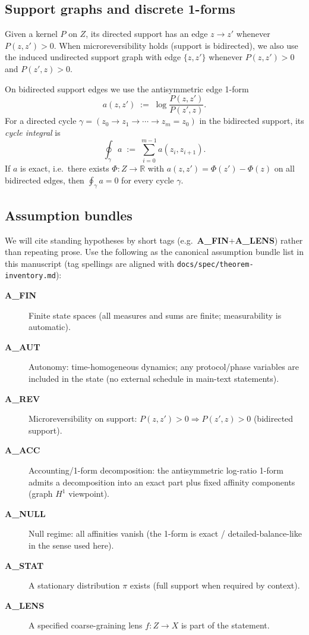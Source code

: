 \documentclass[11pt]{article}
\theoremstyle{remark}
\begin{document}
\subsection{Support graphs and discrete 1-forms}

Given a kernel $P$ on $Z$, its directed support has an edge $z\to z'$ whenever $P(z,z')>0$.
When microreversibility holds (support is bidirected), we also use the induced undirected support graph with edge $\{z,z'\}$ whenever $P(z,z')>0$ and $P(z',z)>0$.

On bidirected support edges we use the antisymmetric edge 1-form
\[
a(z,z') \;:=\; \log\frac{P(z,z')}{P(z',z)}.
\]
For a directed cycle $\gamma=(z_0\!\to z_1\!\to\cdots\to z_m=z_0)$ in the bidirected support, its \emph{cycle integral} is
\[
\oint_\gamma a \;:=\; \sum_{i=0}^{m-1} a(z_i,z_{i+1}).
\]
If $a$ is exact, i.e.\ there exists $\Phi:Z\to\mathbb{R}$ with $a(z,z')=\Phi(z')-\Phi(z)$ on all bidirected edges, then $\oint_\gamma a=0$ for every cycle $\gamma$.

\subsection{Assumption bundles}

We will cite standing hypotheses by short tags (e.g.\ \textbf{A\_FIN}+\textbf{A\_LENS}) rather than repeating prose.
Use the following as the canonical assumption bundle list in this manuscript (tag spellings are aligned with \texttt{docs/spec/theorem-inventory.md}):

\begin{description}
  \item[\textbf{A\_FIN}] Finite state spaces (all measures and sums are finite; measurability is automatic).
  \item[\textbf{A\_AUT}] Autonomy: time-homogeneous dynamics; any protocol/phase variables are included in the state (no external schedule in main-text statements).
  \item[\textbf{A\_REV}] Microreversibility on support: $P(z,z')>0 \Rightarrow P(z',z)>0$ (bidirected support).
  \item[\textbf{A\_ACC}] Accounting/1-form decomposition: the antisymmetric log-ratio 1-form admits a decomposition into an exact part plus fixed affinity components (graph $H^1$ viewpoint).
  \item[\textbf{A\_NULL}] Null regime: all affinities vanish (the 1-form is exact / detailed-balance-like in the sense used here).
  \item[\textbf{A\_STAT}] A stationary distribution $\pi$ exists (full support when required by context).
  \item[\textbf{A\_LENS}] A specified coarse-graining lens $f:Z\to X$ is part of the statement.
\end{description}
\end{document}
